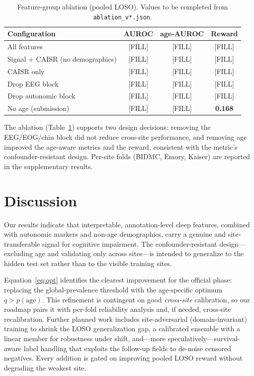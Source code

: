 \documentclass{cinc}
\begin{document}
\begin{table}[t]
\centering
\caption{Feature-group ablation (pooled LOSO). Values to be completed from
\texttt{ablation\_v*.json}.}
\label{tab:ablation}
\begin{tabular}{lccc}
\toprule
Configuration & AUROC & age-AUROC & Reward \\
\midrule
All features                     & [FILL] & [FILL] & [FILL] \\
Signal + CAISR (no demographics) & [FILL] & [FILL] & [FILL] \\
CAISR only                       & [FILL] & [FILL] & [FILL] \\
Drop EEG block                   & [FILL] & [FILL] & [FILL] \\
Drop autonomic block             & [FILL] & [FILL] & [FILL] \\
No age (submission)              & [FILL] & [FILL] & \textbf{0.168} \\
\bottomrule
\end{tabular}
\end{table}

The ablation (Table~\ref{tab:ablation}) supports two design decisions:
removing the EEG/EOG/chin block did not reduce cross-site performance, and
removing age improved the age-aware metrics and the reward, consistent with
the metric's confounder-resistant design. Per-site folds
(BIDMC, Emory, Kaiser) are reported in the supplementary results.

\section{Discussion}
\label{sec:discussion}

Our results indicate that interpretable, annotation-level sleep features,
combined with autonomic markers and non-age demographics, carry a genuine and
site-transferable signal for cognitive impairment. The confounder-resistant
design—excluding age and validating only across sites—is intended to
generalize to the hidden test set rather than to the visible training sites.

Equation~\eqref{eq:opt} identifies the clearest improvement for the official
phase: replacing the global-prevalence threshold with the age-specific
optimum $q>p(\text{age})$. This refinement is contingent on good
\emph{cross-site} calibration, so our roadmap pairs it with per-fold
reliability analysis and, if needed, cross-site recalibration. Further
planned work includes site-adversarial (domain-invariant) training to shrink
the LOSO generalization gap, a calibrated ensemble with a linear member for
robustness under shift, and—more speculatively—survival-aware label handling
that exploits the follow-up fields to de-noise censored negatives. Every
addition is gated on improving pooled LOSO reward without degrading the
weakest site.
\end{document}
